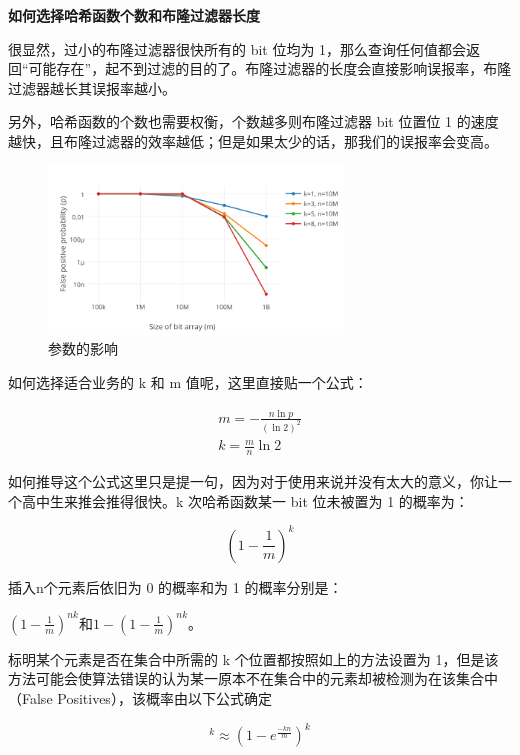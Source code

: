 \documentclass[cn,11pt,chinese]{elegantbook}
\begin{document}
\textbf{如何选择哈希函数个数和布隆过滤器长度}

很显然，过小的布隆过滤器很快所有的 bit 位均为 1，那么查询任何值都会返回“可能存在”，起不到过滤的目的了。布隆过滤器的长度会直接影响误报率，布隆过滤器越长其误报率越小。

另外，哈希函数的个数也需要权衡，个数越多则布隆过滤器 bit 位置位 1 的速度越快，且布隆过滤器的效率越低；但是如果太少的话，那我们的误报率会变高。

\begin{figure}[htbp]
    \centering
    \includegraphics[width=0.7\textwidth]{images/bloomfilter.png}
    \caption{参数的影响}
\end{figure}

如何选择适合业务的 k 和 m 值呢，这里直接贴一个公式：

\begin{align}
    m = - \frac{n \ln p}{(\ln 2)^2} \\
    k = \frac{m}{n} \ln 2
\end{align}

如何推导这个公式这里只是提一句，因为对于使用来说并没有太大的意义，你让一个高中生来推会推得很快。k 次哈希函数某一 bit 位未被置为 1 的概率为：

\begin{equation}
    (1 - \frac{1}{m})^k
\end{equation}

插入n个元素后依旧为 0 的概率和为 1 的概率分别是：

$(1 - \frac{1}{m})^{nk}$和$1-(1-\frac{1}{m})^{nk}$。

标明某个元素是否在集合中所需的 k 个位置都按照如上的方法设置为 1，但是该方法可能会使算法错误的认为某一原本不在集合中的元素却被检测为在该集合中（False Positives），该概率由以下公式确定

\begin{equation}
    [1-(1-\frac{1}{m})^{nk}]^k \approx (1 - e^{\frac{-kn}{m}})^k
\end{equation}
\end{document}
